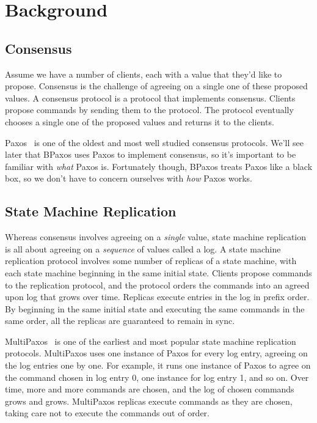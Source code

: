 \section{Background}

\subsection{Consensus}
Assume we have a number of clients, each with a value that they'd like to
propose. Consensus is the challenge of agreeing on a single one of these
proposed values. A consensus protocol is a protocol that implements consensus.
Clients propose commands by sending them to the protocol. The protocol
eventually chooses a single one of the proposed values and returns it to the
clients.

Paxos~\cite{lamport1998part, lamport2001paxos} is one of the oldest and most
well studied consensus protocols. We'll see later that BPaxos uses Paxos to
implement consensus, so it's important to be familiar with \emph{what} Paxos
is. Fortunately though, BPaxos treats Paxos like a black box, so we don't have
to concern ourselves with \emph{how} Paxos works.

\subsection{State Machine Replication}
Whereas consensus involves agreeing on a \emph{single} value, state machine
replication is all about agreeing on a \emph{sequence} of values called a log.
A state machine replication protocol involves some number of replicas of a
state machine, with each state machine beginning in the same initial state.
Clients propose commands to the replication protocol, and the protocol orders
the commands into an agreed upon log that grows over time.  Replicas execute
entries in the log in prefix order. By beginning in the same initial state and
executing the same commands in the same order, all the replicas are guaranteed
to remain in sync.

MultiPaxos~\cite{van2015paxos} is one of the earliest and most popular state
machine replication protocols. MultiPaxos uses one instance of Paxos for every
log entry, agreeing on the log entries one by one. For example, it runs one
instance of Paxos to agree on the command chosen in log entry 0, one instance
for log entry 1, and so on. Over time, more and more commands are chosen, and
the log of chosen commands grows and grows. MultiPaxos replicas execute
commands as they are chosen, taking care not to execute the commands out of
order.

